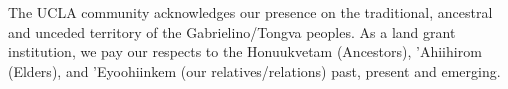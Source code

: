 
\vspace*{\fill}
\begin{center}
    \begin{minipage}{.7\linewidth}
        The UCLA community acknowledges our presence on the traditional, ancestral and unceded territory of the Gabrielino/Tongva peoples.
        As a land grant institution, we pay our respects to the Honuukvetam (Ancestors), 'Ahiihirom (Elders), and 'Eyoohiinkem (our relatives/relations) past, present and emerging.
    \end{minipage}
\end{center}
\vspace*{\fill}
